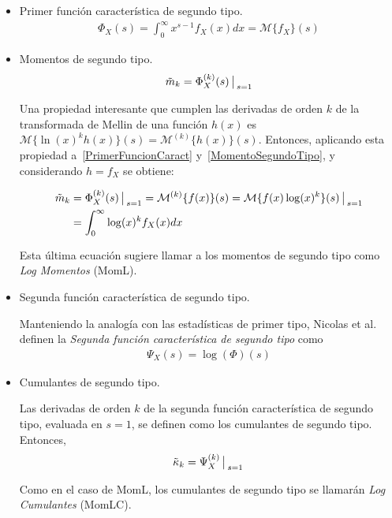 \begin{itemize}
\item Primer función característica de segundo tipo.
	\begin{align}
	\Phi_X(s)=\int_{0}^{\infty} x^{s-1} f_X(x) dx = \mathcal{M}\{f_X\}(s)
	\label{PrimerFuncionCaract}
	\end{align}
\item Momentos de segundo tipo.
	\begin{align}
	\label{MomentoSegundoTipo}
	\tilde{m}_k=\Phi_X^{(k)}(s) \big\arrowvert _{s=1}
	\end{align}


	Una propiedad interesante que cumplen las derivadas de orden $k$ de la transformada de Mellin de una función $h(x)$ es $\mathcal{M}\{\ln(x)^k h(x)\}(s)=\mathcal{M}^{(k)}\{h(x)\}(s)$. Entonces, aplicando esta propiedad a~\eqref{PrimerFuncionCaract} y~\eqref{MomentoSegundoTipo}, y considerando $h=f_X$ se obtiene:

	\begin{align}
	\label{MomL}
	\nonumber \tilde{m}_k&=\Phi_X^{(k)}(s) \big\arrowvert _{s=1} =\mathcal{M}^{(k)}\{f(x)\}(s) =\mathcal{M}\{f(x) \log(x)^k\}(s)\big\arrowvert _{s=1}          \\
 	        &=\int_{0}^{\infty} \log(x)^k f_X(x) dx 
	\end{align}

	Esta última ecuación sugiere llamar a los momentos de segundo tipo como \textit{Log Momentos} (MomL).
	
\item Segunda función característica de segundo tipo.

      Manteniendo la analogía con las estadísticas de primer tipo, Nicolas et al.~\cite{nicolas2002} definen la \textit{Segunda función característica de segundo tipo} como
      \begin{align}
      \label{Sgunda Psi}
      \Psi_X(s)=\log(\Phi)(s)
      \end{align}
      
\item Cumulantes de segundo tipo.

	  Las derivadas de orden $k$ de la segunda función característica de segundo tipo, evaluada en $s=1$, se definen como los cumulantes de segundo tipo. Entonces,
	  \begin{align}
	  \label{CumulanteSegundoTipo}
	  \tilde{\kappa}_k=\Psi_X^{(k)}\big\arrowvert _{s=1}
	  \end{align}
	  
Como en el caso de MomL, los cumulantes de segundo tipo se llamarán \textit{Log Cumulantes} (MomLC).
\end{itemize}

